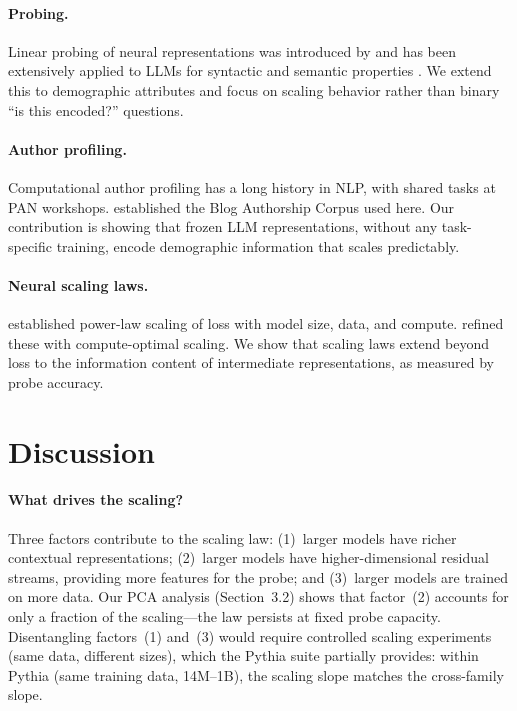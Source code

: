 \documentclass{article}
\begin{document}
\paragraph{Probing.} Linear probing of neural representations was introduced by \citet{alain2017understanding} and has been extensively applied to LLMs for syntactic and semantic properties \citep{hewitt2019structural, belinkov2022probing}. We extend this to demographic attributes and focus on scaling behavior rather than binary ``is this encoded?'' questions.

\paragraph{Author profiling.} Computational author profiling has a long history in NLP, with shared tasks at PAN workshops. \citet{schler2006effects} established the Blog Authorship Corpus used here. Our contribution is showing that frozen LLM representations, without any task-specific training, encode demographic information that scales predictably.

\paragraph{Neural scaling laws.} \citet{kaplan2020scaling} established power-law scaling of loss with model size, data, and compute. \citet{hoffmann2022training} refined these with compute-optimal scaling. We show that scaling laws extend beyond loss to the information content of intermediate representations, as measured by probe accuracy.

\section{Discussion}

\paragraph{What drives the scaling?} Three factors contribute to the scaling law: (1)~larger models have richer contextual representations; (2)~larger models have higher-dimensional residual streams, providing more features for the probe; and (3)~larger models are trained on more data. Our PCA analysis (Section~3.2) shows that factor~(2) accounts for only a fraction of the scaling---the law persists at fixed probe capacity. Disentangling factors~(1) and~(3) would require controlled scaling experiments (same data, different sizes), which the Pythia suite partially provides: within Pythia (same training data, 14M--1B), the scaling slope matches the cross-family slope.
\end{document}
